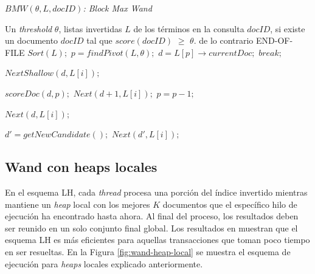\begin{algorithm}[!th]
\caption{\em $BMW(\theta, L, docID)$: Block Max Wand}
\label{alg:bmw}
\begin{algorithmic}[1]
\REQUIRE Un \textit{threshold} $\theta$, listas invertidas $L$ de los términos en la consulta
\ENSURE $docID$, si existe un documento $docID$ tal que $score(docID)$ $\geq$ $\theta$. de lo contrario END-OF-FILE
	\STATE $Sort(L);$
	\STATE $p = findPivot(L,\theta);$
	\STATE $d = L[p] \rightarrow currentDoc;$
  		\STATE $break;$
	\ENDIF
		
		\STATE $NextShallow(d, L[i]);$
	\ENDFOR
	
			\STATE $scoreDoc(d, p);$
				\STATE $Next(d + 1, L[i]);$
			\ENDFOR
		\ELSE
				\STATE $p = p - 1;$			
			\ENDWHILE
			
				\STATE $Next(d, L[i]);$
			\ENDFOR
			
		\ENDIF		
	\ELSE	
		\STATE $d' = getNewCandidate();$
			\STATE $Next(d', L[i]);$
		\ENDFOR
	\ENDIF
	
\ENDWHILE

\end{algorithmic}
\end{algorithm}

\subsection{Wand con heaps locales}
En el esquema LH, cada \textit{thread} procesa una porción del índice invertido mientras mantiene un \textit{heap} local con los mejores $K$ documentos que el específico hilo de ejecución ha encontrado hasta ahora. Al final del proceso, los resultados deben ser reunido en un solo conjunto final global. Los resultados en \citep{Rojas:2013} muestran que el esquema LH es más eficientes para aquellas transacciones que toman poco tiempo en ser resueltas. En la Figura \ref{fig:wand-heap-local} se muestra el esquema de ejecución para \textit{heaps} locales explicado anteriormente. 

